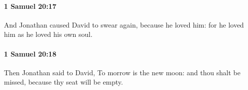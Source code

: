 		\paragraph{1 Samuel 20:17} %
			\label{1SAMUEL-20-17}

			And Jonathan caused David to swear again, because he loved him: for he loved him as he loved his own soul.


		\paragraph{1 Samuel 20:18} %
			\label{1SAMUEL-20-18}

			Then Jonathan said to David, To morrow is the new moon: and thou shalt be missed, because thy seat will be empty.


